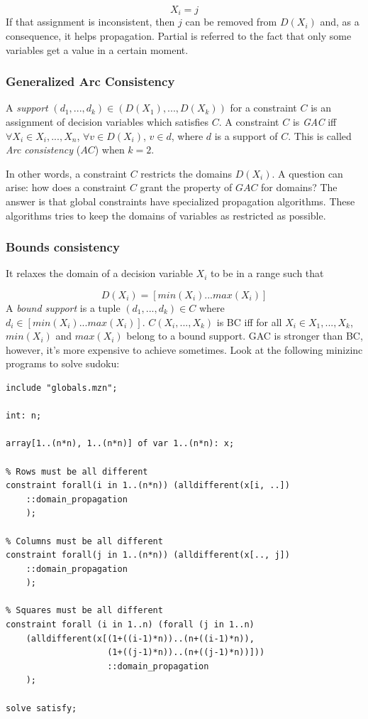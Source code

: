 \documentclass[10pt,a4paper]{article}
\begin{document}
\[ X_i = j \]
If that assignment is inconsistent, then $j$ can be removed from $D(X_i)$ and,
as a consequence, it helps propagation. Partial is referred to the fact that
only some variables get a value in a certain moment.

\subsubsection{Generalized Arc Consistency}
A \textit{support} $(d_1, ..., d_k) \in (D(X_1), ..., D(X_k))$  for a constraint
$C$ is an assignment of decision variables which satisfies $C$.
A constraint $C$ is \textit{GAC} iff $\forall X_i \in {X_i, ..., X_n}$,
$\forall v \in D(X_i)$, $v \in d$, where $d$ is a support of $C$.
This is called \textit{Arc consistency} ($AC$) when $k = 2$.

In other words, a constraint $C$ restricts the domains $D(X_i)$. A question can
arise: how does a constraint $C$ grant the property of $GAC$ for domains? The
answer is that global constraints have specialized propagation algorithms. These
algorithms tries to keep the domains of variables as restricted as possible.

\subsubsection{Bounds consistency}
It relaxes the domain of a decision variable $X_i$ to be in a range such that

\[ D(X_i) = [min(X_i)...max(X_i)] \]
A \textit{bound support} is a tuple $(d_1, ..., d_k) \in C$ where
$d_i \in [min(X_i)...max(X_i)]$. $C(X_i, ..., X_k)$ is BC iff for all $X_i \in
{X_1, ..., X_k}$, $min(X_i)$ and $max(X_i)$ belong to a bound support. GAC is
stronger than BC, however, it's more expensive to achieve sometimes. Look at the
following minizinc programs to solve sudoku:

\pagebreak

\begin{lstlisting}[style=none]
include "globals.mzn";

int: n;

array[1..(n*n), 1..(n*n)] of var 1..(n*n): x;

% Rows must be all different
constraint forall(i in 1..(n*n)) (alldifferent(x[i, ..])
    ::domain_propagation
    );

% Columns must be all different
constraint forall(j in 1..(n*n)) (alldifferent(x[.., j])
    ::domain_propagation
    );

% Squares must be all different
constraint forall (i in 1..n) (forall (j in 1..n)
	(alldifferent(x[(1+((i-1)*n))..(n+((i-1)*n)),
                    (1+((j-1)*n))..(n+((j-1)*n))]))
                    ::domain_propagation
	);

solve satisfy;
\end{lstlisting}
\end{document}
